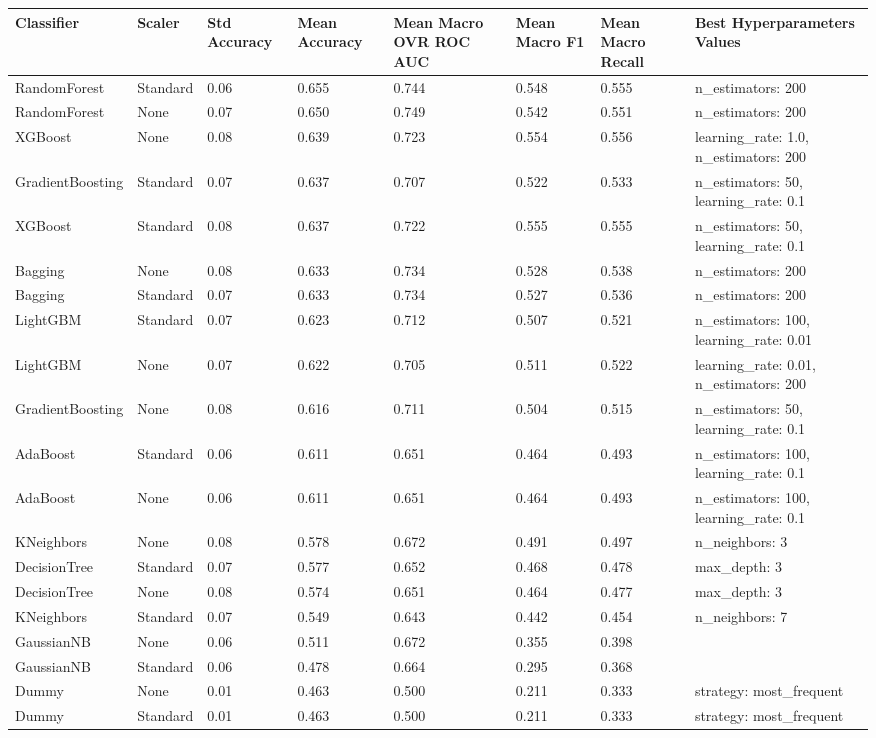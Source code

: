 \begin{tabular}{llllllll}
\toprule
Classifier & Scaler & Std Accuracy & Mean Accuracy & Mean Macro OVR ROC AUC & Mean Macro F1 & Mean Macro Recall & Best Hyperparameters Values \\
\midrule
RandomForest & Standard & 0.06 & 0.655 & 0.744 & 0.548 & 0.555 & {{n\_estimators: 200}} \\
RandomForest & None & 0.07 & 0.650 & 0.749 & 0.542 & 0.551 & {{n\_estimators: 200}} \\
XGBoost & None & 0.08 & 0.639 & 0.723 & 0.554 & 0.556 & {{learning\_rate: 1.0,  n\_estimators: 200}} \\
GradientBoosting & Standard & 0.07 & 0.637 & 0.707 & 0.522 & 0.533 & {{n\_estimators: 50,  learning\_rate: 0.1}} \\
XGBoost & Standard & 0.08 & 0.637 & 0.722 & 0.555 & 0.555 & {{n\_estimators: 50,  learning\_rate: 0.1}} \\
Bagging & None & 0.08 & 0.633 & 0.734 & 0.528 & 0.538 & {{n\_estimators: 200}} \\
Bagging & Standard & 0.07 & 0.633 & 0.734 & 0.527 & 0.536 & {{n\_estimators: 200}} \\
LightGBM & Standard & 0.07 & 0.623 & 0.712 & 0.507 & 0.521 & {{n\_estimators: 100,  learning\_rate: 0.01}} \\
LightGBM & None & 0.07 & 0.622 & 0.705 & 0.511 & 0.522 & {{learning\_rate: 0.01,  n\_estimators: 200}} \\
GradientBoosting & None & 0.08 & 0.616 & 0.711 & 0.504 & 0.515 & {{n\_estimators: 50,  learning\_rate: 0.1}} \\
AdaBoost & Standard & 0.06 & 0.611 & 0.651 & 0.464 & 0.493 & {{n\_estimators: 100,  learning\_rate: 0.1}} \\
AdaBoost & None & 0.06 & 0.611 & 0.651 & 0.464 & 0.493 & {{n\_estimators: 100,  learning\_rate: 0.1}} \\
KNeighbors & None & 0.08 & 0.578 & 0.672 & 0.491 & 0.497 & {{n\_neighbors: 3}} \\
DecisionTree & Standard & 0.07 & 0.577 & 0.652 & 0.468 & 0.478 & {{max\_depth: 3}} \\
DecisionTree & None & 0.08 & 0.574 & 0.651 & 0.464 & 0.477 & {{max\_depth: 3}} \\
KNeighbors & Standard & 0.07 & 0.549 & 0.643 & 0.442 & 0.454 & {{n\_neighbors: 7}} \\
GaussianNB & None & 0.06 & 0.511 & 0.672 & 0.355 & 0.398 & {{}} \\
GaussianNB & Standard & 0.06 & 0.478 & 0.664 & 0.295 & 0.368 & {{}} \\
Dummy & None & 0.01 & 0.463 & 0.500 & 0.211 & 0.333 & {{strategy: most\_frequent}} \\
Dummy & Standard & 0.01 & 0.463 & 0.500 & 0.211 & 0.333 & {{strategy: most\_frequent}} \\
\bottomrule
\end{tabular}
